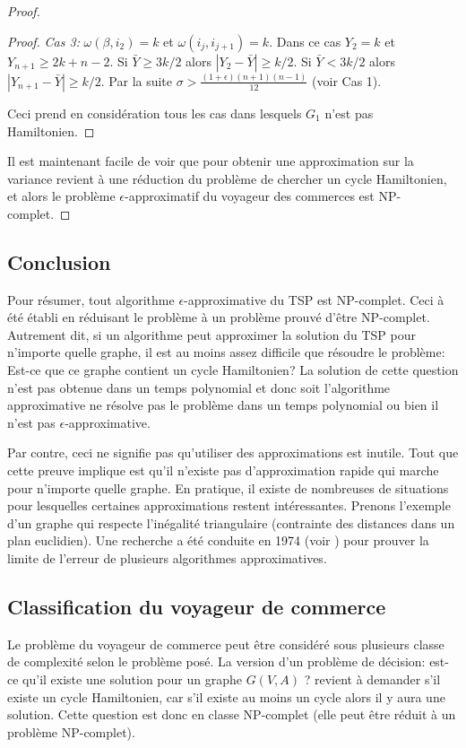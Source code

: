\documentclass[../main.tex]{subfiles}
\begin{document}
\begin{proof}
\begin{proof}
\emph{Cas 3:} $\omega (\beta, i_2) = k$ et $\omega (i_j, i_{j+1})=k$. Dans ce cas $Y_2=k$ et $Y_{n+1} \geq 2k+n-2$. Si $\bar{Y} \geq 3k/2$ alors $|Y_2 - \bar{Y}| \geq k/2$. Si $\bar{Y} < 3k/2$ alors $|Y_{n+1} - \bar{Y}| \geq k/2$. Par la suite $\sigma > \frac{(1+\epsilon)(n+1)(n-1)}{12}$ (voir Cas 1).

Ceci prend en considération tous les cas dans lesquels $G_1$ n'est pas Hamiltonien.
\end{proof}

Il est maintenant facile de voir que pour obtenir une approximation sur la variance revient à une réduction du problème de chercher un cycle Hamiltonien, et alors le problème $\epsilon$-approximatif du voyageur des commerces est NP-complet.

\end{proof}

\subsection{Conclusion}
Pour résumer, tout algorithme $\epsilon$-approximative du TSP est NP-complet. Ceci à été établi en réduisant le problème à un problème prouvé d'être NP-complet. Autrement dit, si un algorithme peut approximer la solution du TSP pour n'importe quelle graphe, il est au moins assez difficile que résoudre le problème: Est-ce que ce graphe contient un cycle Hamiltonien? La solution de cette question n'est pas obtenue dans un temps polynomial et donc soit l'algorithme approximative ne résolve pas le problème dans un temps polynomial ou bien il n'est pas $\epsilon$-approximative.

Par contre, ceci ne signifie pas qu'utiliser des approximations est inutile. Tout que cette preuve implique est qu'il n'existe pas d'approximation rapide qui marche pour n'importe quelle graphe. En pratique, il existe de nombreuses de situations pour lesquelles certaines approximations restent intéressantes. Prenons l'exemple d'un graphe qui respecte l'inégalité triangulaire (contrainte des distances dans un plan euclidien). Une recherche a été conduite en 1974 (voir \cite{rosenkrantz1974}) pour prouver la limite de l'erreur de plusieurs algorithmes approximatives.

\subsection{Classification du voyageur de commerce}
Le problème du voyageur de commerce peut être considéré sous plusieurs classe de complexité selon le problème posé. La version d'un problème de décision: est-ce qu'il existe une solution pour un graphe $G(V,A)$ ? revient à demander s'il existe un cycle Hamiltonien, car s'il existe au moins un cycle alors il y aura une solution. Cette question est donc en classe NP-complet (elle peut être réduit à un problème NP-complet).
\end{document}

